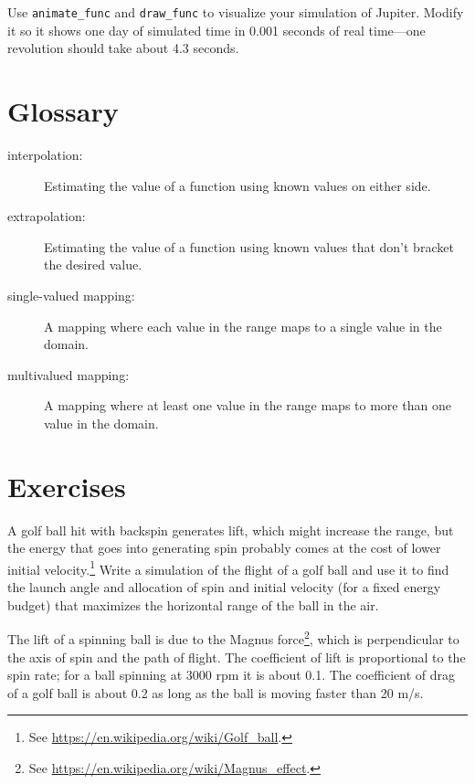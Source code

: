 \documentclass[
]{book}
\numberwithin{Answer}{chapter}
\numberwithin{Exercise}{chapter}
\begin{document}
\begin{ex}
Use {\tt animate\_func} and {\tt draw\_func} to visualize your
simulation of Jupiter.  Modify it so it shows one day of simulated
time in 0.001 seconds of real time---one revolution should take
about 4.3 seconds.
\end{ex}



\section{Glossary}

\begin{description}

\item[interpolation:] Estimating the value of a function using
known values on either side.

\item[extrapolation:] Estimating the value of a function using
known values that don't bracket the desired value.

\item[single-valued mapping:] A mapping where each value in the
range maps to a single value in the domain.

\item[multivalued mapping:] A mapping where at least one value in
the range maps to more than one value in the domain.

\end{description}


\section{Exercises}

\begin{ex}
\label{ex:golf}

A golf ball hit with backspin
generates lift, which might increase the range, but the energy that
goes into generating spin probably comes at the cost of lower initial
velocity.\footnote{See \url{https://en.wikipedia.org/wiki/Golf_ball}.}
Write a simulation of the flight of a golf ball and use it to find
the launch angle and allocation of spin and initial velocity
(for a fixed energy budget) that maximizes the horizontal range of the
ball in the air.

The lift of a spinning ball is due to the Magnus force\footnote{See
\url{https://en.wikipedia.org/wiki/Magnus_effect}.}, which is
perpendicular to the axis of spin and the path of flight.  The
coefficient of lift is proportional to the spin rate; for a ball
spinning at 3000 rpm it is about 0.1.  The coefficient of drag of a
golf ball is about 0.2 as long as the ball is moving faster than 20 m/s.
\end{ex}
\end{document}
